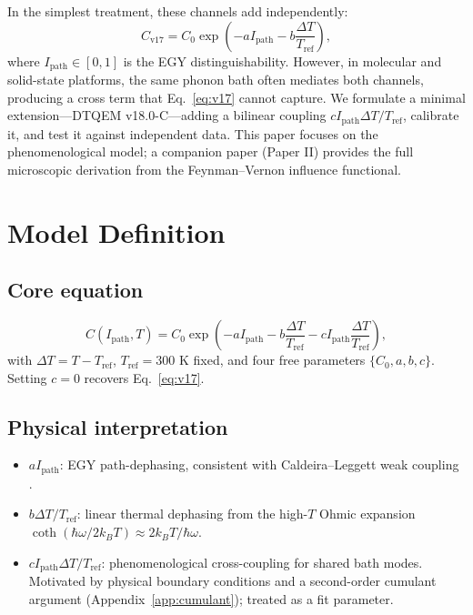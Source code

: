 \documentclass[aps,pra,reprint,amsmath,amssymb,superscriptaddress]{revtex4-2}
\newcommand{\coth}{\operatorname{coth}}
\begin{document}
In the simplest treatment, these channels add independently:
\begin{equation}
C_{\text{v17}} = C_0 \exp\left(-a I_{\text{path}} - b\frac{\Delta T}{T_{\text{ref}}}\right),
\label{eq:v17}
\end{equation}
where $I_{\text{path}} \in [0, 1]$ is the EGY distinguishability. However, in molecular and solid-state platforms, the same phonon bath often mediates both channels, producing a cross term that Eq.~\eqref{eq:v17} cannot capture. We formulate a minimal extension---DTQEM v18.0-C---adding a bilinear coupling $c I_{\text{path}} \Delta T/T_{\text{ref}}$, calibrate it, and test it against independent data. This paper focuses on the phenomenological model; a companion paper (Paper II) provides the full microscopic derivation from the Feynman--Vernon influence functional.

\section{Model Definition}
\subsection{Core equation}
\begin{equation}
C(I_{\text{path}}, T) = C_0 \exp\left(-a I_{\text{path}} - b \frac{\Delta T}{T_{\text{ref}}} - c I_{\text{path}} \frac{\Delta T}{T_{\text{ref}}}\right),
\label{eq:v18}
\end{equation}
with $\Delta T = T - T_{\text{ref}}$, $T_{\text{ref}} = 300$ K fixed, and four free parameters $\{C_0, a, b, c\}$. Setting $c=0$ recovers Eq.~\eqref{eq:v17}.

\subsection{Physical interpretation}
\begin{itemize}
    \item $a I_{\text{path}}$: EGY path-dephasing, consistent with Caldeira--Leggett weak coupling \cite{Weiss2012}.
    \item $b\Delta T/T_{\text{ref}}$: linear thermal dephasing from the high-$T$ Ohmic expansion $\coth(\hbar\omega/2k_B T) \approx 2k_B T/\hbar\omega$.
    \item $c I_{\text{path}}\Delta T/T_{\text{ref}}$: phenomenological cross-coupling for shared bath modes. Motivated by physical boundary conditions and a second-order cumulant argument (Appendix~\ref{app:cumulant}); treated as a fit parameter.
\end{itemize}
\end{document}
